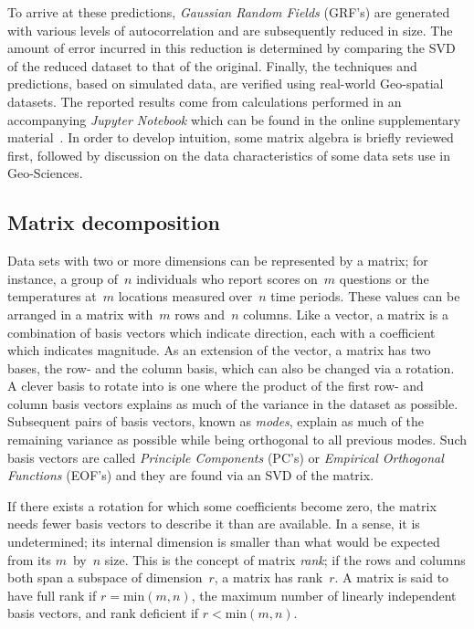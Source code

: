 \documentclass[ijgi,article,submit,moreauthors,pdftex,10pt,a4paper]{Definitions/mdpi}
\begin{document}
To arrive at these predictions, \textit{Gaussian Random Fields} (GRF's) are generated with various levels of autocorrelation and are subsequently reduced in size. The amount of error incurred in this reduction is determined by comparing the SVD of the reduced dataset to that of the original. Finally, the techniques and predictions, based on simulated data, are verified using real-world Geo-spatial datasets. The reported results come from calculations performed in an accompanying \textit{Jupyter Notebook} which can be found in the online supplementary material~\cite{Bogaardt2018}. In order to develop intuition, some matrix algebra is briefly reviewed first, followed by discussion on the data characteristics of some data sets use in Geo-Sciences.

\subsection{Matrix decomposition}
\label{sec:Introduction/Matrix decompostion}

Data sets with two or more dimensions can be represented by a matrix; for instance, a group of~$n$ individuals who report scores on~$m$ questions or the temperatures at~$m$ locations measured over~$n$ time periods. These values can be arranged in a matrix with~$m$ rows and~$n$ columns. Like a vector, a matrix is a combination of basis vectors which indicate direction, each with a coefficient which indicates magnitude. As an extension of the vector, a matrix has two bases, the row- and the column basis, which can also be changed via a rotation. A clever basis to rotate into is one where the product of the first row- and column basis vectors explains as much of the variance in the dataset as possible. Subsequent pairs of basis vectors, known as \textit{modes}, explain as much of the remaining variance as possible while being orthogonal to all previous modes. Such basis vectors are called \textit{Principle Components} (PC's) or \textit{Empirical Orthogonal Functions} (EOF's) and they are found via an SVD of the matrix.

If there exists a rotation for which some coefficients become zero, the matrix needs fewer basis vectors to describe it than are available. In a sense, it is undetermined; its internal dimension is smaller than what would be expected from its $m$~by~$n$ size. This is the concept of matrix \textit{rank}; if the rows and columns both span a subspace of dimension~$r$, a matrix has rank~$r$. A matrix is said to have full rank if $r = \text{min}(m, n)$, the maximum number of linearly independent basis vectors, and rank deficient if $r < \text{min}(m, n)$. 
\end{document}
